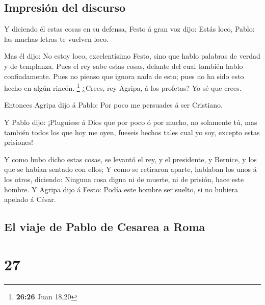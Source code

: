 \hypertarget{impresiuxf3n-del-discurso}{%
\subsection{Impresión del discurso}\label{impresiuxf3n-del-discurso}}

 Y diciendo él estas cosas en su defensa, Festo á gran voz
dijo: Estás loco, Pablo: las muchas letras te vuelven loco.

 Mas él dijo: No estoy loco, excelentísimo Festo, sino que
hablo palabras de verdad y de templanza.  Pues el rey sabe
estas cosas, delante del cual también hablo confiadamente. Pues no
pienso que ignora nada de esto; pues no ha sido esto hecho en algún
rincón. \footnote{\textbf{26:26} Juan 18,20}  ¿Crees, rey
Agripa, á los profetas? Yo sé que crees.

 Entonces Agripa dijo á Pablo: Por poco me persuades á ser
Cristiano.

 Y Pablo dijo: ¡Pluguiese á Dios que por poco ó por mucho,
no solamente tú, mas también todos los que hoy me oyen, fueseis hechos
tales cual yo soy, excepto estas prisiones!

 Y como hubo dicho estas cosas, se levantó el rey, y el
presidente, y Bernice, y los que se habían sentado con ellos;
 Y como se retiraron aparte, hablaban los unos á los otros,
diciendo: Ninguna cosa digna ni de muerte, ni de prisión, hace este
hombre.  Y Agripa dijo á Festo: Podía este hombre ser
suelto, si no hubiera apelado á César.

\hypertarget{el-viaje-de-pablo-de-cesarea-a-roma}{%
\subsection{El viaje de Pablo de Cesarea a
Roma}\label{el-viaje-de-pablo-de-cesarea-a-roma}}

\hypertarget{section-26}{%
\section{27}\label{section-26}}

